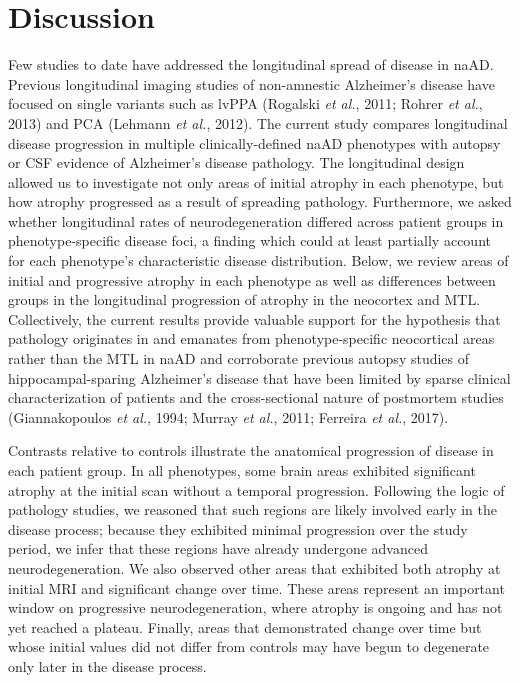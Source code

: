 \documentclass[]{article}
\begin{document}
\section*{Discussion}\label{discussion}

Few studies to date have addressed the longitudinal spread of disease in
naAD. Previous longitudinal imaging studies of non-amnestic Alzheimer's
disease have focused on single variants such as lvPPA (Rogalski \emph{et
al.}, 2011; Rohrer \emph{et al.}, 2013) and PCA (Lehmann \emph{et al.},
2012). The current study compares longitudinal disease progression in
multiple clinically-defined naAD phenotypes with autopsy or CSF evidence
of Alzheimer's disease pathology. The longitudinal design allowed us to
investigate not only areas of initial atrophy in each phenotype, but how
atrophy progressed as a result of spreading pathology. Furthermore, we
asked whether longitudinal rates of neurodegeneration differed across
patient groups in phenotype-specific disease foci, a finding which could
at least partially account for each phenotype's characteristic disease
distribution. Below, we review areas of initial and progressive atrophy
in each phenotype as well as differences between groups in the
longitudinal progression of atrophy in the neocortex and MTL.
Collectively, the current results provide valuable support for the
hypothesis that pathology originates in and emanates from
phenotype-specific neocortical areas rather than the MTL in naAD and
corroborate previous autopsy studies of hippocampal-sparing Alzheimer's
disease that have been limited by sparse clinical characterization of
patients and the cross-sectional nature of postmortem studies
(Giannakopoulos \emph{et al.}, 1994; Murray \emph{et al.}, 2011;
Ferreira \emph{et al.}, 2017).

Contrasts relative to controls illustrate the anatomical progression of
disease in each patient group. In all phenotypes, some brain areas
exhibited significant atrophy at the initial scan without a temporal
progression. Following the logic of pathology studies, we reasoned that
such regions are likely involved early in the disease process; because
they exhibited minimal progression over the study period, we infer that
these regions have already undergone advanced neurodegeneration. We also
observed other areas that exhibited both atrophy at initial MRI and
significant change over time. These areas represent an important window
on progressive neurodegeneration, where atrophy is ongoing and has not
yet reached a plateau. Finally, areas that demonstrated change over time
but whose initial values did not differ from controls may have begun to
degenerate only later in the disease process.
\end{document}
